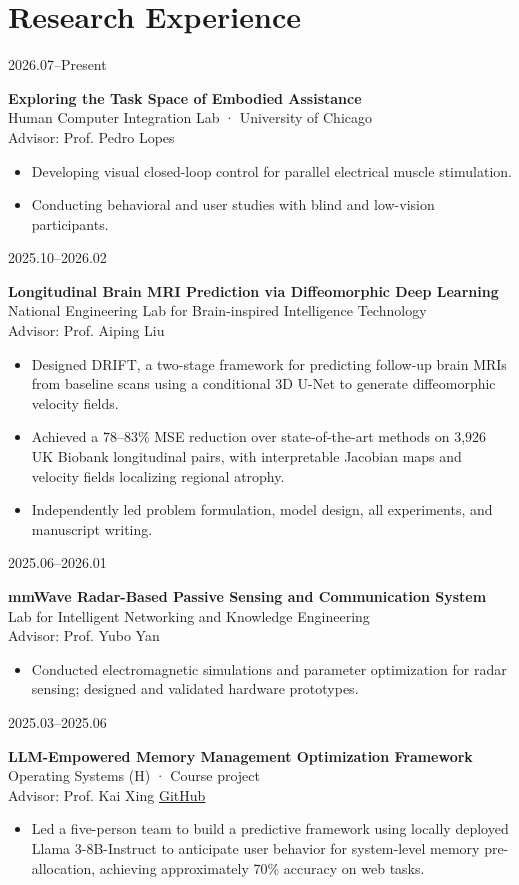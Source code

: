 \documentclass[10pt,a4paper]{article}
\newcommand{\entry}[2]{\noindent\begin{minipage}[t]{.19\linewidth}\small #1\end{minipage}\hfill\begin{minipage}[t]{.79\linewidth}#2\end{minipage}\par\vspace{7pt}}
\begin{document}
\section*{Research Experience}
\entry{2026.07--Present}{\textbf{Exploring the Task Space of Embodied Assistance}\\
Human Computer Integration Lab · University of Chicago\\
Advisor: Prof. Pedro Lopes
\begin{itemize}
\item Developing visual closed-loop control for parallel electrical muscle stimulation.
\item Conducting behavioral and user studies with blind and low-vision participants.
\end{itemize}}
\entry{2025.10--2026.02}{\textbf{Longitudinal Brain MRI Prediction via Diffeomorphic Deep Learning}\\
National Engineering Lab for Brain-inspired Intelligence Technology\\
Advisor: Prof. Aiping Liu
\begin{itemize}
\item Designed DRIFT, a two-stage framework for predicting follow-up brain MRIs from baseline scans using a conditional 3D U-Net to generate diffeomorphic velocity fields.
\item Achieved a 78--83\% MSE reduction over state-of-the-art methods on 3,926 UK Biobank longitudinal pairs, with interpretable Jacobian maps and velocity fields localizing regional atrophy.
\item Independently led problem formulation, model design, all experiments, and manuscript writing.
\end{itemize}}
\entry{2025.06--2026.01}{\textbf{mmWave Radar-Based Passive Sensing and Communication System}\\
Lab for Intelligent Networking and Knowledge Engineering\\
Advisor: Prof. Yubo Yan
\begin{itemize}
\item Conducted electromagnetic simulations and parameter optimization for radar sensing; designed and validated hardware prototypes.
\end{itemize}}
\entry{2025.03--2025.06}{\textbf{LLM-Empowered Memory Management Optimization Framework}\\
Operating Systems (H) · Course project\\
Advisor: Prof. Kai Xing
\quad\href{https://github.com/OSH-2025/MEMO}{GitHub}
\begin{itemize}
\item Led a five-person team to build a predictive framework using locally deployed Llama 3-8B-Instruct to anticipate user behavior for system-level memory pre-allocation, achieving approximately 70\% accuracy on web tasks.
\end{itemize}}
\end{document}
